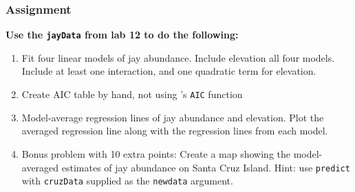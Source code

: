 \documentclass[color=usenames,dvipsnames]{beamer}\usepackage[]{graphicx}\usepackage[]{color}
\begin{document}
\begin{frame}
  \frametitle{Assignment}


  {\bf \large Use the {\tt jayData} from lab 12 to do the following: \\}
  
  \begin{enumerate}[\bf (1)]
    \normalsize
    \item Fit four linear models of jay abundance. Include elevation
      all four models. Include at least 
      one interaction, and one quadratic term for elevation.
    \item Create AIC table by hand, not using \R's {\tt AIC} function
    \item Model-average regression lines of jay abundance and
      elevation. Plot the averaged regression line along with the
      regression lines from each model.
    \item Bonus problem with 10 extra points: Create a map showing the
      model-averaged estimates of jay 
      abundance on Santa Cruz Island. Hint: use {\tt predict} with
      {\tt cruzData} supplied as the {\tt newdata} argument.
  \end{enumerate}
\end{frame}
\end{document}
